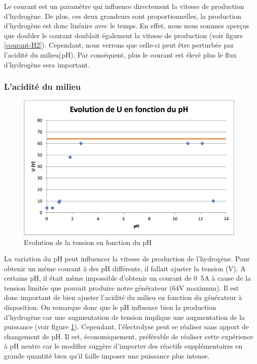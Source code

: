 Le courant est un paramètre qui influence directement la vitesse de production d'hydrogène. De plus, ces deux grandeurs sont proportionnelles, la production d'hydrogène est donc linéaire avec le temps. En effet, nous nous sommes aperçus que doubler le courant doublait également la vitesse de production (voir figure \ref{courant-H2}). Cependant, nous verrons que celle-ci peut être perturbée par l'acidité du milieu(pH). Par conséquent, plus le courant est élevé plus le flux d'hydrogène sera important.

\subsubsection{L'acidité du milieu}


\begin{figure}
\begin{center}
\includegraphics[scale=0.7]{task7/poi.png}
\end{center}
\caption{Evolution de la tension en fonction du pH}
\label{tension-ph}
\end{figure}

La variation du pH peut influencer la vitesse de production de l'hydrogène. Pour obtenir un même courant à des pH différents, il fallait ajuster la tension (V). A certains pH, il était même impossible d'obtenir un courant de \unit{0.5}{A} à cause de la tension limitée que pouvait produire notre générateur (\unit{64}{V} maximum). Il est donc important de bien ajuster l'acidité du milieu en fonction du générateur à disposition. On remarque donc que le pH influence bien la production d'hydrogène car une augmentation de tension implique une augmentation de la puissance (voir figure \ref{tension-ph}). Cependant, l'électrolyse peut se réaliser sans apport de changement de pH. Il est, économiquement, préférable de réaliser cette expérience à pH neutre car le modifier suggère d'importer des réactifs supplémentaires en grande quantité bien qu'il faille imposer une puissance plus intense. 


